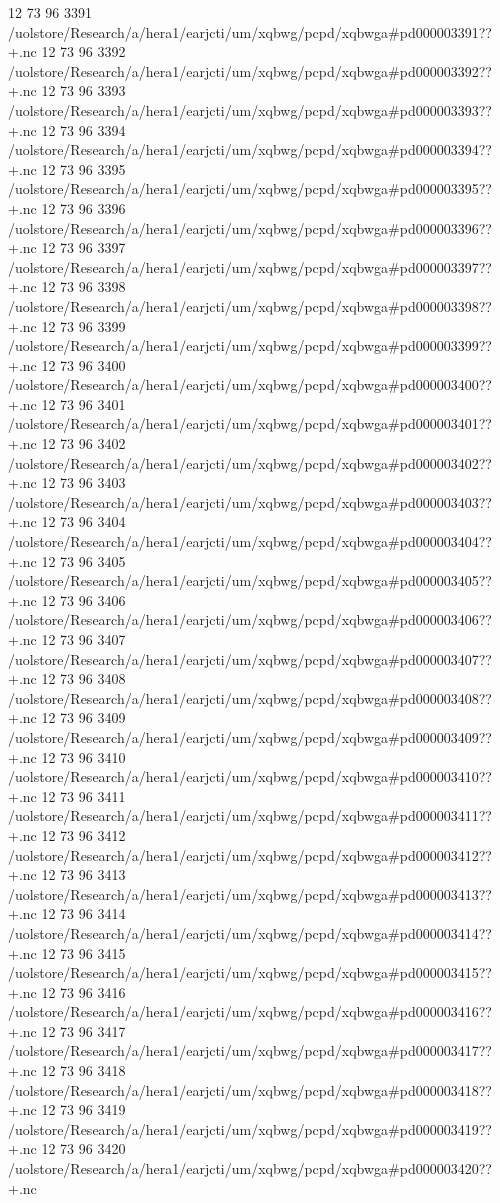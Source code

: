 12 73 96
3391
/uolstore/Research/a/hera1/earjcti/um/xqbwg/pcpd/xqbwga#pd000003391??+.nc
12 73 96
3392
/uolstore/Research/a/hera1/earjcti/um/xqbwg/pcpd/xqbwga#pd000003392??+.nc
12 73 96
3393
/uolstore/Research/a/hera1/earjcti/um/xqbwg/pcpd/xqbwga#pd000003393??+.nc
12 73 96
3394
/uolstore/Research/a/hera1/earjcti/um/xqbwg/pcpd/xqbwga#pd000003394??+.nc
12 73 96
3395
/uolstore/Research/a/hera1/earjcti/um/xqbwg/pcpd/xqbwga#pd000003395??+.nc
12 73 96
3396
/uolstore/Research/a/hera1/earjcti/um/xqbwg/pcpd/xqbwga#pd000003396??+.nc
12 73 96
3397
/uolstore/Research/a/hera1/earjcti/um/xqbwg/pcpd/xqbwga#pd000003397??+.nc
12 73 96
3398
/uolstore/Research/a/hera1/earjcti/um/xqbwg/pcpd/xqbwga#pd000003398??+.nc
12 73 96
3399
/uolstore/Research/a/hera1/earjcti/um/xqbwg/pcpd/xqbwga#pd000003399??+.nc
12 73 96
3400
/uolstore/Research/a/hera1/earjcti/um/xqbwg/pcpd/xqbwga#pd000003400??+.nc
12 73 96
3401
/uolstore/Research/a/hera1/earjcti/um/xqbwg/pcpd/xqbwga#pd000003401??+.nc
12 73 96
3402
/uolstore/Research/a/hera1/earjcti/um/xqbwg/pcpd/xqbwga#pd000003402??+.nc
12 73 96
3403
/uolstore/Research/a/hera1/earjcti/um/xqbwg/pcpd/xqbwga#pd000003403??+.nc
12 73 96
3404
/uolstore/Research/a/hera1/earjcti/um/xqbwg/pcpd/xqbwga#pd000003404??+.nc
12 73 96
3405
/uolstore/Research/a/hera1/earjcti/um/xqbwg/pcpd/xqbwga#pd000003405??+.nc
12 73 96
3406
/uolstore/Research/a/hera1/earjcti/um/xqbwg/pcpd/xqbwga#pd000003406??+.nc
12 73 96
3407
/uolstore/Research/a/hera1/earjcti/um/xqbwg/pcpd/xqbwga#pd000003407??+.nc
12 73 96
3408
/uolstore/Research/a/hera1/earjcti/um/xqbwg/pcpd/xqbwga#pd000003408??+.nc
12 73 96
3409
/uolstore/Research/a/hera1/earjcti/um/xqbwg/pcpd/xqbwga#pd000003409??+.nc
12 73 96
3410
/uolstore/Research/a/hera1/earjcti/um/xqbwg/pcpd/xqbwga#pd000003410??+.nc
12 73 96
3411
/uolstore/Research/a/hera1/earjcti/um/xqbwg/pcpd/xqbwga#pd000003411??+.nc
12 73 96
3412
/uolstore/Research/a/hera1/earjcti/um/xqbwg/pcpd/xqbwga#pd000003412??+.nc
12 73 96
3413
/uolstore/Research/a/hera1/earjcti/um/xqbwg/pcpd/xqbwga#pd000003413??+.nc
12 73 96
3414
/uolstore/Research/a/hera1/earjcti/um/xqbwg/pcpd/xqbwga#pd000003414??+.nc
12 73 96
3415
/uolstore/Research/a/hera1/earjcti/um/xqbwg/pcpd/xqbwga#pd000003415??+.nc
12 73 96
3416
/uolstore/Research/a/hera1/earjcti/um/xqbwg/pcpd/xqbwga#pd000003416??+.nc
12 73 96
3417
/uolstore/Research/a/hera1/earjcti/um/xqbwg/pcpd/xqbwga#pd000003417??+.nc
12 73 96
3418
/uolstore/Research/a/hera1/earjcti/um/xqbwg/pcpd/xqbwga#pd000003418??+.nc
12 73 96
3419
/uolstore/Research/a/hera1/earjcti/um/xqbwg/pcpd/xqbwga#pd000003419??+.nc
12 73 96
3420
/uolstore/Research/a/hera1/earjcti/um/xqbwg/pcpd/xqbwga#pd000003420??+.nc
